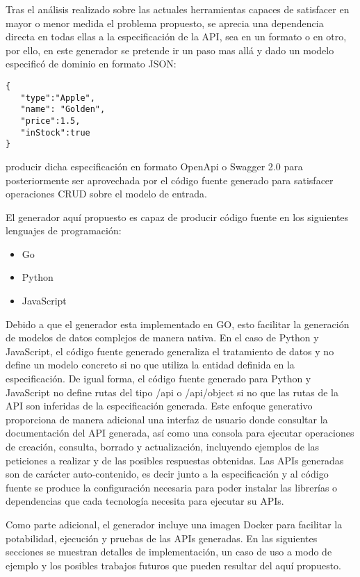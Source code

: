 \documentclass{svproc}
\begin{document}
Tras el análisis realizado sobre las actuales herramientas capaces de satisfacer en mayor o menor medida el problema propuesto, se aprecia una dependencia directa en todas ellas a la especificación de la API, sea en un formato o en otro, por ello, en este generador se pretende ir un paso mas allá y dado un modelo especificó de dominio en formato JSON: 
\begin{lstlisting}
{
   "type":"Apple",
   "name": "Golden",
   "price":1.5,
   "inStock":true
}
\end{lstlisting}

producir dicha especificación en formato OpenApi o Swagger 2.0 para posteriormente ser aprovechada por el código fuente generado para satisfacer operaciones CRUD sobre el modelo de entrada.

El generador aquí propuesto es capaz de producir  código fuente en los siguientes lenguajes de programación:

\begin{itemize}
\item Go
\item Python
\item JavaScript
\end{itemize}

Debido  a que el generador esta implementado en GO, esto facilitar la generación de modelos de datos complejos de manera nativa. En el caso de Python y JavaScript, el código fuente generado generaliza el tratamiento de datos y no define un modelo concreto si no que utiliza la entidad definida en la especificación. De igual forma, el código fuente generado para Python y JavaScript no define rutas del tipo /api o /api/object si no que las rutas de la API son inferidas de la especificación generada. Este enfoque generativo proporciona de manera adicional una interfaz de usuario donde consultar la documentación del API generada, así como una consola para ejecutar operaciones de creación, consulta, borrado y actualización, incluyendo ejemplos de las peticiones a realizar y de las posibles respuestas obtenidas.  Las APIs generadas son de carácter auto-contenido,  es decir junto a la especificación y al código fuente se produce la configuración necesaria para poder instalar las librerías o dependencias que cada tecnología necesita para ejecutar su APIs. 

Como parte adicional, el generador incluye una imagen Docker para facilitar la potabilidad, ejecución y pruebas de las APIs generadas. En las siguientes secciones se muestran detalles de implementación, un caso de uso a modo de ejemplo y los posibles trabajos futuros que pueden resultar del aquí propuesto. 
\end{document}
